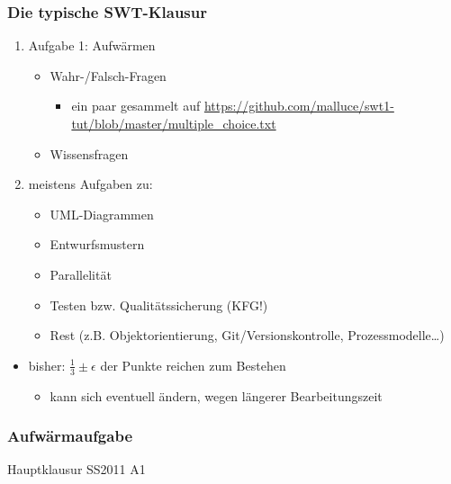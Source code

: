 \documentclass[18pt]{beamer}
\begin{document}
	\begin{frame}
		\frametitle{Die typische SWT-Klausur}
		\begin{enumerate}
			\item Aufgabe 1: Aufwärmen
			\begin{itemize}
				\item Wahr-/Falsch-Fragen 
				\begin{itemize}
					\item ein paar gesammelt auf \small \url{https://github.com/malluce/swt1-tut/blob/master/multiple_choice.txt}
				\end{itemize} 
				\item Wissensfragen 
			\end{itemize} 
			\pause
			\item meistens Aufgaben zu:
			\begin{itemize}
				\item UML-Diagrammen \pause
				\item Entwurfsmustern \pause
				\item Parallelität \pause
				\item Testen bzw. Qualitätssicherung (KFG!) \pause
				\item Rest (z.B. Objektorientierung, Git/Versionskontrolle, Prozessmodelle\dots)
			\end{itemize}
		\end{enumerate}
		\pause 
		\begin{itemize}
			\item bisher: $\frac{1}{3} \pm \epsilon$ der Punkte reichen zum Bestehen
			\begin{itemize}
				\item kann sich eventuell ändern, wegen längerer Bearbeitungszeit
			\end{itemize}
		\end{itemize}
	\end{frame}

	\begin{frame}
		\frametitle{Aufwärmaufgabe}
		\begin{huge}
			\centering Hauptklausur SS2011 A1
		\end{huge}
	\end{frame}
\end{document}
